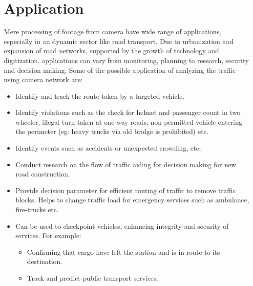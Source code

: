 \section{Application}
Mere processing of footage from camera have wide range of applications, especially in an dynamic sector like road transport. Due to urbanization and expansion of road networks, supported by the growth of technology and digitization, applications can vary from monitoring, planning to research, security and decision making. Some of the possible application of analyzing the traffic using camera network are:
\begin{itemize}
	\item Identify and track the route taken by a targeted vehicle.
	\item Identify violations such as the check for helmet and passenger count in two wheeler, illegal turn taken at one-way roads, non-permitted vehicle entering the perimeter (eg: heavy trucks via old bridge is prohibited) etc.
	\item Identify events such as accidents or unexpected crowding, etc.
	\item Conduct research on the flow of traffic aiding for decision making for new road construction.
	\item Provide decision parameter for efficient routing of traffic to remove traffic blocks. Helps to change traffic load for emergency services such as ambulance, fire-trucks etc.
	\item Can be used to checkpoint vehicles, enhancing integrity and security of services. For example:
	\begin{itemize}
		\item Confirming that cargo have left the station and is in-route to its destination.
		\item Track and predict public transport services.
	\end{itemize}
\end{itemize}